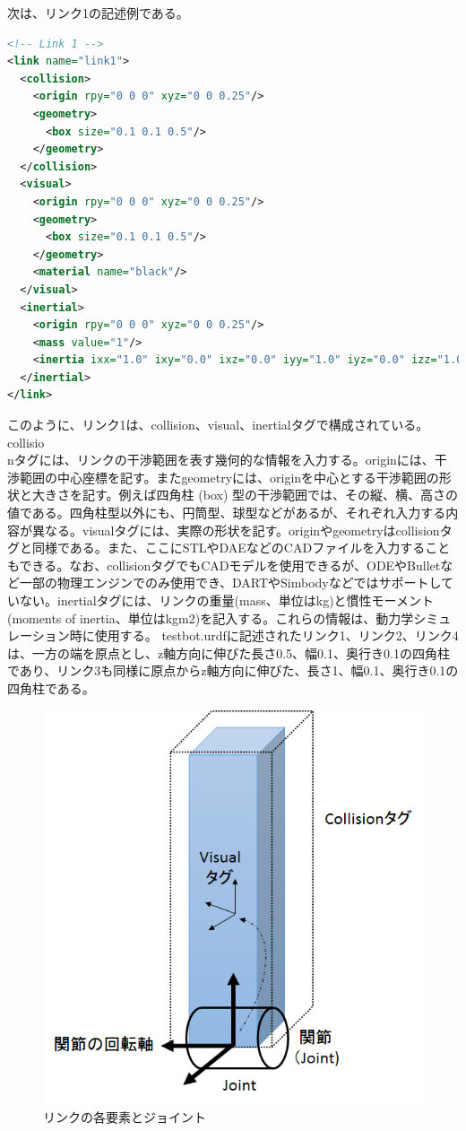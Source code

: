 次は、リンク1の記述例である。

\begin{lstlisting}[language=XML]
<!-- Link 1 -->
<link name="link1">
  <collision>
    <origin rpy="0 0 0" xyz="0 0 0.25"/>
    <geometry>
      <box size="0.1 0.1 0.5"/>
    </geometry>
  </collision>
  <visual>
    <origin rpy="0 0 0" xyz="0 0 0.25"/>
    <geometry>
      <box size="0.1 0.1 0.5"/>
    </geometry>
    <material name="black"/>
  </visual>
  <inertial>
    <origin rpy="0 0 0" xyz="0 0 0.25"/>
    <mass value="1"/>
    <inertia ixx="1.0" ixy="0.0" ixz="0.0" iyy="1.0" iyz="0.0" izz="1.0"/>
  </inertial>
</link>
\end{lstlisting}

このように、リンク1は、collision、visual、inertialタグで構成されている。collisio\\nタグには、リンクの干渉範囲を表す幾何的な情報を入力する。originには、干渉範囲の中心座標を記す。またgeometryには、originを中心とする干渉範囲の形状と大きさを記す。例えば四角柱 (box) 型の干渉範囲では、その縦、横、高さの値である。四角柱型以外にも、円筒型、球型などがあるが、それぞれ入力する内容が異なる。visualタグには、実際の形状を記す。originやgeometryはcollisionタグと同様である。また、ここにSTLやDAEなどのCADファイルを入力することもできる。なお、collisionタグでもCADモデルを使用できるが、ODEやBulletなど一部の物理エンジンでのみ使用でき、DARTやSimbodyなどではサポートしていない。inertialタグには、リンクの重量(mass、単位はkg)と慣性モーメント(moments of inertia、単位はkgm2)を記入する。これらの情報は、動力学シミュレーション時に使用する。
testbot.urdfに記述されたリンク1、リンク2、リンク4は、一方の端を原点とし、z軸方向に伸びた長さ0.5、幅0.1、奥行き0.1の四角柱であり、リンク3も同様に原点からz軸方向に伸びた、長さ1、幅0.1、奥行き0.1の四角柱である。

\begin{figure}[htp]
  \centering
  \includegraphics[width=12cm]{pictures/chapter11/pic_11_03.png}
  \caption{リンクの各要素とジョイント}
\end{figure}

